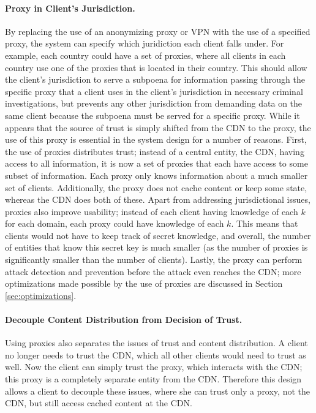\paragraph{Proxy in Client's Jurisdiction.} By replacing the use of an anonymizing proxy or VPN with the use 
of a specified proxy, the system can specify which juridiction each client falls under.  For example, 
each country could have a set of proxies, where all clients in each country use one of the proxies that 
is located in their country.  This should allow the client's jurisdiction to serve a subpoena for information 
passing through the specific proxy that a client uses in the client's jurisdiction in 
necessary criminal investigations, but prevents any other jurisdiction from demanding data on the same 
client because the subpoena must be served for a specific proxy.  While it appears that the source of 
trust is simply shifted from the CDN to the proxy, the use of this proxy is essential in 
the system design for a number of reasons.  First, the use of proxies distributes trust; instead of a 
central entity, the CDN, having access to all information, it is now a set of proxies that each have 
access to some subset of information.  Each proxy only knows information about a much smaller set of clients.  
Additionally, the proxy does not cache content or keep some state, whereas the CDN does both of these.  Apart 
from addressing jurisdictional issues, proxies also improve usability; instead of each client having knowledge 
of each $k$ for each domain, each proxy could have knowledge of each $k$.  This means that clients would 
not have to keep track of secret knowledge, and overall, the number of entities that know this secret key 
is much smaller (as the number of proxies is significantly smaller than the number of clients).  Lastly, 
the proxy can perform attack detection and prevention before the attack even reaches the CDN; more optimizations 
made possible by the use of proxies are discussed in Section \ref{sec:optimizations}.

\paragraph{Decouple Content Distribution from Decision of Trust.} Using proxies also separates the issues of 
trust and content distribution.  A client no longer needs to trust the CDN, which all other clients would 
need to trust as well.  Now the client can simply trust the proxy, which interacts with the CDN; this proxy 
is a completely separate entity from the CDN.  Therefore this design allows a client to decouple these 
issues, where she can trust only a proxy, not the CDN, but still access cached content at the CDN.

